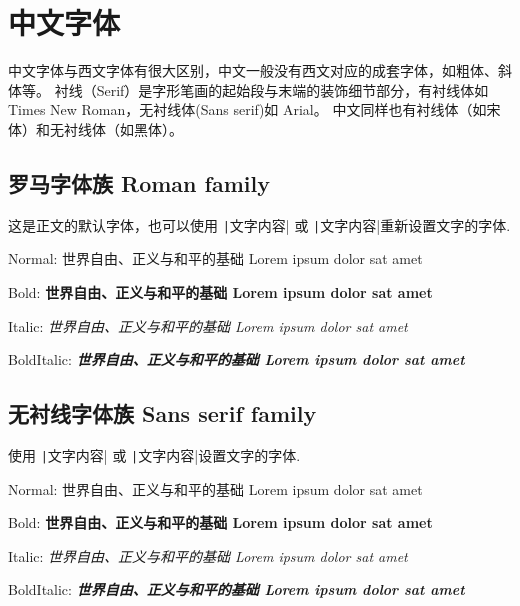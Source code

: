 \section{中文字体}

中文字体与西文字体有很大区别，中文一般没有西文对应的成套字体，如粗体、斜体等。
衬线（Serif）是字形笔画的起始段与末端的装饰细节部分，有衬线体如Times New Roman，无衬线体(Sans serif)如 Arial。
中文同样也有衬线体（如宋体）和无衬线体（如黑体）。

\subsection{罗马字体族 Roman family}

这是正文的默认字体，也可以使用 \texttt|\textrm{文字内容}| 或 \texttt|{\rmfamily 文字内容}|重新设置文字的字体.

\begin{compactitems}
  \item Normal: {\rmfamily \mdseries 世界自由、正义与和平的基础 Lorem ipsum dolor sat amet}
  \item Bold: {\rmfamily \bfseries 世界自由、正义与和平的基础 Lorem ipsum dolor sat amet}
  \item Italic: {\rmfamily \itshape 世界自由、正义与和平的基础 Lorem ipsum dolor sat amet}
  \item BoldItalic: {\rmfamily \bfseries \itshape 世界自由、正义与和平的基础 Lorem ipsum dolor sat amet}
\end{compactitems}

\subsection{无衬线字体族 Sans serif family}

使用 \texttt|\textsf{文字内容}| 或 \texttt|{\sffamily 文字内容}|设置文字的字体.

\begin{compactitems}
  \item Normal: {\sffamily \mdseries 世界自由、正义与和平的基础 Lorem ipsum dolor sat amet}
  \item Bold: {\sffamily \bfseries 世界自由、正义与和平的基础 Lorem ipsum dolor sat amet}
  \item Italic: {\sffamily \itshape 世界自由、正义与和平的基础 Lorem ipsum dolor sat amet}
  \item BoldItalic: {\sffamily \bfseries \itshape 世界自由、正义与和平的基础 Lorem ipsum dolor sat amet}
\end{compactitems}

